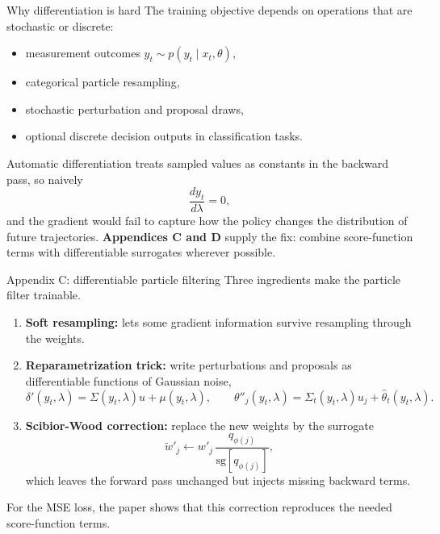 \documentclass[aspectratio=169]{beamer}
\begin{document}
\begin{frame}{Why differentiation is hard}
The training objective depends on operations that are stochastic or discrete:
\begin{itemize}
  \item measurement outcomes $y_t\sim p(y_t\mid x_t,\theta)$,
  \item categorical particle resampling,
  \item stochastic perturbation and proposal draws,
  \item optional discrete decision outputs in classification tasks.
\end{itemize}
\vspace{0.5em}
Automatic differentiation treats sampled values as constants in the backward pass, so naively
\[
  \frac{d y_t}{d\lambda}=0,
\]
and the gradient would fail to capture how the policy changes the distribution of future trajectories.
\vspace{0.5em}
\textbf{Appendices C and D} supply the fix: combine score-function terms with differentiable surrogates wherever possible.
\end{frame}

\begin{frame}{Appendix C: differentiable particle filtering}
Three ingredients make the particle filter trainable.
\vspace{0.3em}
\begin{enumerate}
  \item \textbf{Soft resampling:} lets some gradient information survive resampling through the weights.
  \item \textbf{Reparametrization trick:} write perturbations and proposals as differentiable functions of Gaussian noise,
  \[
    \delta'(y_t,\lambda)=\Sigma(y_t,\lambda)u+\mu(y_t,\lambda),
    \qquad
    \theta''_j(y_t,\lambda)=\Sigma_t(y_t,\lambda)u_j+\hat\theta_t(y_t,\lambda).
  \]
  \item \textbf{Scibior-Wood correction:} replace the new weights by the surrogate
  \[
    \tilde w'_j \leftarrow w'_j\,\frac{q_{\phi(j)}}{\mathrm{sg}[q_{\phi(j)}]},
  \]
  which leaves the forward pass unchanged but injects missing backward terms.
\end{enumerate}
\vspace{0.4em}
For the MSE loss, the paper shows that this correction reproduces the needed score-function terms.
\end{frame}
\end{document}
